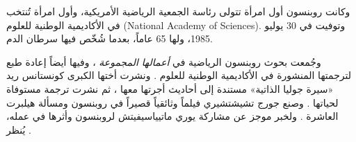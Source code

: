 \documentclass[../../../include/open-logic-section]{subfiles}
\begin{document}
وكانت روبنسون أول امرأة تتولى رئاسة الجمعية الرياضية الأمريكية، وأول
امرأة تُنتخب في الأكاديمية الوطنية للعلوم (National Academy of
Sciences). وتوفيت في 30 يوليو 1985، ولها 65 عاماً، بعدما شُخّص فيها سرطان
الدم.

\begin{reading}
وجُمعت بحوث روبنسون الرياضية في \textit{أعمالها المجموعة}
\citep{Robinson1996}، وفيها أيضاً إعادة طبع لترجمتها المنشورة في
الأكاديمية الوطنية للعلوم \citep{Feferman1994}. ونشرت أختها الكبرى
كونستانس ريد «سيرة جوليا الذاتية» مستندة إلى أحاديث أجرتها معها
\citep{Reid1986}، ثم نشرت ترجمة مستوفاة لحياتها \citep{Reid1996}. وصنع
جورج تشيشتشيري فيلماً وثائقياً قصيراً في روبنسون ومسألة هيلبرت العاشرة
\citep{Csicsery2016}. ولخبر موجز عن مشاركة يوري ماتيياسيفيتش لروبنسون
وأثرها في عمله، يُنظر \citep{Matijasevich1992}.
\end{reading}
\end{document}
